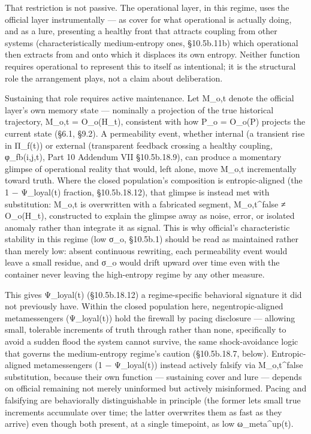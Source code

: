 \documentclass[
]{article}
\begin{document}
That restriction is not passive. The operational layer, in this regime,
uses the official layer instrumentally --- as cover for what operational
is actually doing, and as a lure, presenting a healthy front that
attracts coupling from other systems (characteristically medium-entropy
ones, §10.5b.11b) which operational then extracts from and onto which it
displaces its own entropy. Neither function requires operational to
represent this to itself as intentional; it is the structural role the
arrangement plays, not a claim about deliberation.

Sustaining that role requires active maintenance. Let M\_o,t denote the
official layer's own memory state --- nominally a projection of the true
historical trajectory, M\_o,t = O\_o(H\_t), consistent with how P\_o =
O\_o(P) projects the current state (§6.1, §9.2). A permeability event,
whether internal (a transient rise in Π\_f(t)) or external (transparent
feedback crossing a healthy coupling, φ\_fb(i,j,t), Part 10 Addendum VII
§10.5b.18.9), can produce a momentary glimpse of operational reality
that would, left alone, move M\_o,t incrementally toward truth. Where
the closed population's composition is entropic-aligned (the 1 −
Ψ\_loyal(t) fraction, §10.5b.18.12), that glimpse is instead met with
substitution: M\_o,t is overwritten with a fabricated segment,
M\_o,t\^{}false ≠ O\_o(H\_t), constructed to explain the glimpse away as
noise, error, or isolated anomaly rather than integrate it as signal.
This is why official's characteristic stability in this regime (low
σ\_o, §10.5b.1) should be read as maintained rather than merely low:
absent continuous rewriting, each permeability event would leave a small
residue, and σ\_o would drift upward over time even with the container
never leaving the high-entropy regime by any other measure.

This gives Ψ\_loyal(t) (§10.5b.18.12) a regime-specific behavioral
signature it did not previously have. Within the closed population here,
negentropic-aligned metamessengers (Ψ\_loyal(t)) hold the firewall by
pacing disclosure --- allowing small, tolerable increments of truth
through rather than none, specifically to avoid a sudden flood the
system cannot survive, the same shock-avoidance logic that governs the
medium-entropy regime's caution (§10.5b.18.7, below). Entropic-aligned
metamessengers (1 − Ψ\_loyal(t)) instead actively falsify via
M\_o,t\^{}false substitution, because their own function --- sustaining
cover and lure --- depends on official remaining not merely uninformed
but actively misinformed. Pacing and falsifying are behaviorally
distinguishable in principle (the former lets small true increments
accumulate over time; the latter overwrites them as fast as they arrive)
even though both present, at a single timepoint, as low
ω\_meta\^{}up(t).
\end{document}

